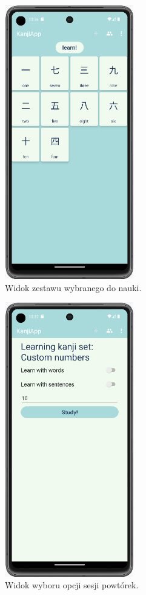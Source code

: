 \documentclass[a4paper,twoside,12pt]{book}
\begin{document}
\begin{figure}[]
\centering
\includegraphics[width=0.5\textwidth]{learn/list}
\caption{Widok zestawu wybranego do nauki.}
\label{fig:list}
\end{figure}

\begin{figure}[]
\centering
\includegraphics[width=0.5\textwidth]{learn/options}
\caption{Widok wyboru opcji sesji powtórek.}
\label{fig:options}
\end{figure}
\end{document}
